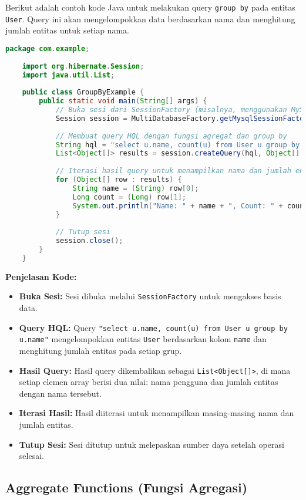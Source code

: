 Berikut adalah contoh kode Java untuk melakukan query \texttt{group by} pada entitas \texttt{User}. Query ini akan mengelompokkan data berdasarkan nama dan menghitung jumlah entitas untuk setiap nama.

\begin{lstlisting}[language=Java, style=JavaStyle]
	package com.example;
	
	import org.hibernate.Session;
	import java.util.List;
	
	public class GroupByExample {
		public static void main(String[] args) {
			// Buka sesi dari SessionFactory (misalnya, menggunakan MySQL)
			Session session = MultiDatabaseFactory.getMysqlSessionFactory().openSession();
			
			// Membuat query HQL dengan fungsi agregat dan group by
			String hql = "select u.name, count(u) from User u group by u.name";
			List<Object[]> results = session.createQuery(hql, Object[].class).list();
			
			// Iterasi hasil query untuk menampilkan nama dan jumlah entitas
			for (Object[] row : results) {
				String name = (String) row[0];
				Long count = (Long) row[1];
				System.out.println("Name: " + name + ", Count: " + count);
			}
			
			// Tutup sesi
			session.close();
		}
	}
\end{lstlisting}

\textbf{Penjelasan Kode:}
\begin{itemize}
	\item \textbf{Buka Sesi:} Sesi dibuka melalui \texttt{SessionFactory} untuk mengakses basis data.
	\item \textbf{Query HQL:} Query \texttt{"select u.name, count(u) from User u group by u.name"} mengelompokkan entitas \texttt{User} berdasarkan kolom \texttt{name} dan menghitung jumlah entitas pada setiap grup.
	\item \textbf{Hasil Query:} Hasil query dikembalikan sebagai \texttt{List<Object[]>}, di mana setiap elemen array berisi dua nilai: nama pengguna dan jumlah entitas dengan nama tersebut.
	\item \textbf{Iterasi Hasil:} Hasil diiterasi untuk menampilkan masing-masing nama dan jumlah entitas.
	\item \textbf{Tutup Sesi:} Sesi ditutup untuk melepaskan sumber daya setelah operasi selesai.
\end{itemize}

\subsection{Aggregate Functions (Fungsi Agregasi)}

